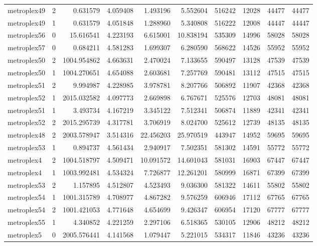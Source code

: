 \begin{longtable}{|l|r|r|r|r|r|r|r|r|r|}
metroplex49 & 2 & 0.631579 & 4.059408 & 1.493196 & 5.552604 & 516242 & 12028 & 44477 & 44477 \\
metroplex49 & 1 & 0.631579 & 4.051848 & 1.288960 & 5.340808 & 516222 & 12008 & 44447 & 44447 \\
metroplex56 & 0 & 15.616541 & 4.223193 & 6.615001 & 10.838194 & 535309 & 14996 & 58028 & 58028 \\
metroplex57 & 0 & 0.684211 & 4.581283 & 1.699307 & 6.280590 & 568622 & 14526 & 55952 & 55952 \\
metroplex50 & 2 & 1004.954862 & 4.663631 & 2.470024 & 7.133655 & 590497 & 13128 & 47539 & 47539 \\
metroplex50 & 1 & 1004.270651 & 4.654088 & 2.603681 & 7.257769 & 590481 & 13112 & 47515 & 47515 \\
metroplex51 & 2 & 9.994987 & 4.228985 & 3.978781 & 8.207766 & 506892 & 11907 & 42368 & 42368 \\
metroplex52 & 1 & 2015.032582 & 4.097773 & 2.669898 & 6.767671 & 525576 & 12703 & 48081 & 48081 \\
metroplex51 & 1 & 3.493734 & 4.167219 & 3.345122 & 7.512341 & 506874 & 11889 & 42341 & 42341 \\
metroplex52 & 2 & 2015.295739 & 4.317781 & 3.706919 & 8.024700 & 525612 & 12739 & 48135 & 48135 \\
metroplex48 & 2 & 2003.578947 & 3.514316 & 22.456203 & 25.970519 & 443947 & 14952 & 59695 & 59695 \\
metroplex53 & 1 & 0.894737 & 4.561434 & 2.940917 & 7.502351 & 581302 & 14591 & 55772 & 55772 \\
metroplex4 & 2 & 1004.518797 & 4.509471 & 10.091572 & 14.601043 & 581031 & 16903 & 67447 & 67447 \\
metroplex4 & 1 & 1003.992481 & 4.534324 & 7.726877 & 12.261201 & 580999 & 16871 & 67399 & 67399 \\
metroplex53 & 2 & 1.157895 & 4.512807 & 4.523493 & 9.036300 & 581322 & 14611 & 55802 & 55802 \\
metroplex54 & 1 & 1001.315789 & 4.708977 & 4.867282 & 9.576259 & 606946 & 17112 & 67765 & 67765 \\
metroplex54 & 2 & 1001.421053 & 4.771648 & 4.654699 & 9.426347 & 606954 & 17120 & 67777 & 67777 \\
metroplex55 & 1 & 4.340852 & 4.221259 & 2.297106 & 6.518365 & 530105 & 12906 & 48212 & 48212 \\
metroplex5 & 0 & 2005.576441 & 4.141568 & 1.079447 & 5.221015 & 534317 & 11846 & 43236 & 43236 \\

\end{longtable}

